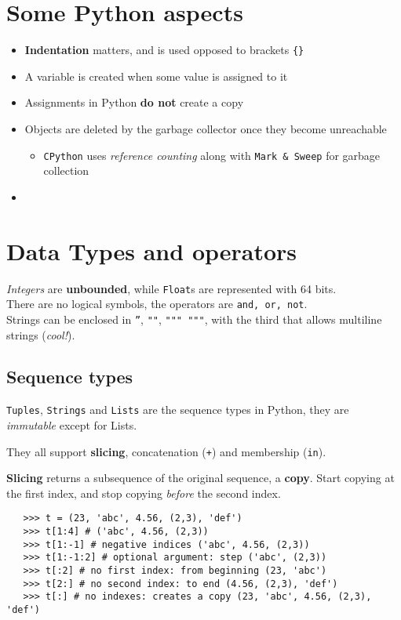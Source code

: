 \section{Some Python aspects}
\begin{itemize}
   \item \textbf{Indentation} matters, and is used opposed to brackets \texttt{\{\}}
   \item A variable is created when some value is assigned to it
   \item Assignments in Python \textbf{do not} create a copy
   \item Objects are deleted by the garbage collector once they become unreachable
   \begin{itemize}
      \item \texttt{CPython} uses \textit{reference counting} along with \texttt{Mark \& Sweep} for garbage collection
   \end{itemize}
   \item 
   \end{itemize}

\section{Data Types and operators}
\textit{Integers} are \textbf{unbounded},
while \texttt{Float}s are represented with 64 bits.\\
There are no logical symbols, the operators are \texttt{and, or, not}.\\
Strings can be enclosed in \texttt{''}, \texttt{""}, \texttt{""" """},
with the third that allows multiline strings (\textit{cool!}).

\subsection{Sequence types}
\texttt{Tuples}, \texttt{Strings} and \texttt{Lists} are the sequence types in Python, they are \textit{immutable} except for Lists.

They all support \textbf{slicing}, concatenation (\lstinline|+|) and membership (\lstinline|in|).

\textbf{Slicing} returns a subsequence of the original sequence, a \textbf{copy}.
Start copying
at the first index, and stop copying \textit{before} the second index.

\lstset{language=python}
\begin{lstlisting}
   >>> t = (23, 'abc', 4.56, (2,3), 'def')
   >>> t[1:4] # ('abc', 4.56, (2,3))
   >>> t[1:-1] # negative indices ('abc', 4.56, (2,3))
   >>> t[1:-1:2] # optional argument: step ('abc', (2,3))
   >>> t[:2] # no first index: from beginning (23, 'abc')
   >>> t[2:] # no second index: to end (4.56, (2,3), 'def')
   >>> t[:] # no indexes: creates a copy (23, 'abc', 4.56, (2,3), 'def')
\end{lstlisting}

